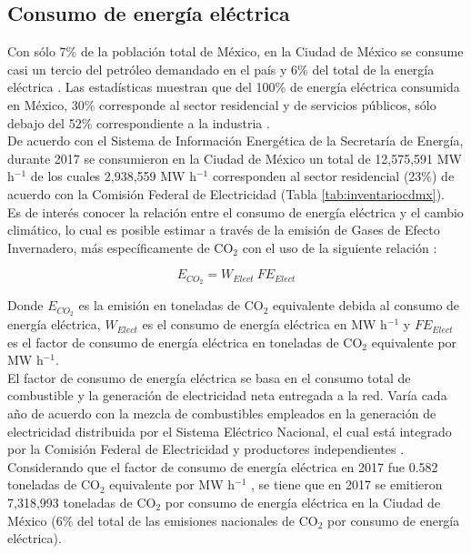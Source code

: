 \newpage

\subsection{Consumo de energía eléctrica}
\label{subsec:consumoenergiaelectrica}

Con sólo 7\% de la población total de México, en la Ciudad de México se consume casi un tercio del petróleo demandado en el país y 6\% del total de la energía eléctrica \citep{SENER2013}. Las estadísticas muestran que del 100\% de energía eléctrica consumida en México, 30\% corresponde al sector residencial y de servicios públicos, sólo debajo del 52\% correspondiente a la industria \citep{Ramos2012}.\\

De acuerdo con el Sistema de Información Energética de la Secretaría de Energía, durante 2017 se consumieron en la Ciudad de México un total de 12,575,591 MW h$^{-1}$ de los cuales 2,938,559 MW h$^{-1}$ corresponden al sector residencial (23\%) de acuerdo con la Comisión Federal de Electricidad (Tabla \ref{tab:inventariocdmx}).\\

Es de interés conocer la relación entre el consumo de energía eléctrica y el cambio climático, lo cual es posible estimar a través de la emisión de Gases de Efecto Invernadero, más específicamente de CO$_{2}$ con el uso de la siguiente relación \citep{UTSEDEMA2018}: 

\begin{equation}
E_{CO_{2}} = W_{Elect}\: FE_{Elect}
\end{equation}

Donde $E_{CO_{2}}$ es la emisión en toneladas de CO$_{2}$ equivalente debida al consumo de energía eléctrica, $W_{Elect}$ es el consumo de energía eléctrica en MW h$^{-1}$ y $FE_{Elect}$ es el factor de consumo de energía eléctrica en toneladas de CO$_{2}$ equivalente por MW h$^{-1}$.\\

El factor de consumo de energía eléctrica se basa en el consumo total de combustible y la generación de electricidad neta entregada a la red. Varía cada año de acuerdo con la mezcla de combustibles empleados en la generación de electricidad distribuida por el Sistema Eléctrico Nacional, el cual está integrado por la Comisión Federal de Electricidad y productores independientes \citep{GEI2013}.\\

Considerando que el factor de consumo de energía eléctrica en 2017 fue 0.582 toneladas de CO$_{2}$ equivalente por MW h$^{-1}$ \citep{CRE2017}, se tiene que en 2017 se emitieron 7,318,993 toneladas de CO$_{2}$ por consumo de energía eléctrica en la Ciudad de México (6\% del total de las emisiones nacionales de CO$_{2}$ por consumo de energía eléctrica).\\

